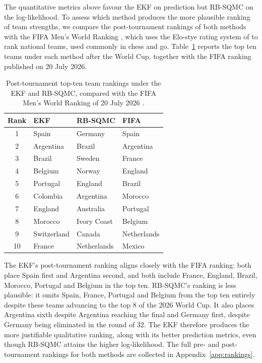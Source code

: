 The quantitative metrics above favour the EKF on prediction but RB-SQMC on the log-likelihood. To assess which method produces the more plausible ranking of team strengths, we compare the post-tournament rankings of both methods with the FIFA Men's World Ranking \citep{fifaworldranking2026}, which uses the Elo-stye rating system of \citet{elo1978rating} to rank national teams, used commonly in chess and go. Table~\ref{tab:fifa-comparison} reports the top ten teams under each method after the World Cup, together with the FIFA ranking published on 20 July 2026.

\begin{table}[H]
\centering
\begin{tabular}{clll}
\toprule
Rank & EKF & RB-SQMC & FIFA \\
\midrule
1 & Spain & Germany & Spain \\
2 & Argentina & Brazil & Argentina \\
3 & Brazil & Sweden & France \\
4 & Belgium & Norway & England \\
5 & Portugal & England & Brazil \\
6 & Colombia & Argentina & Morocco \\
7 & England & Australia & Portugal \\
8 & Morocco & Ivory Coast & Belgium \\
9 & Switzerland & Canada & Netherlands \\
10 & France & Netherlands & Mexico \\
\bottomrule
\end{tabular}
\caption{Post-tournament top-ten team rankings under the EKF and RB-SQMC, compared with the FIFA Men's World Ranking of 20 July 2026 \citep{fifaworldranking2026}.}
\label{tab:fifa-comparison}
\end{table}

The EKF's post-tournament ranking aligns closely with the FIFA ranking: both place Spain first and Argentina second, and both include France, England, Brazil, Morocco, Portugal and Belgium in the top ten. RB-SQMC's ranking is less plausible: it omits Spain, France, Portugal and Belgium from the top ten entirely despite these teams advancing to the top 8 of the 2026 World Cup. It also places Argentina sixth despite Argentina reaching the final and Germany first, despite Germany being eliminated in the round of 32. The EKF therefore produces the more justifiable qualitative ranking, along with its better prediction metrics, even though RB-SQMC attains the higher log-likelihood. The full pre- and post-tournament rankings for both methods are collected in Appendix~\ref{app:rankings}.

